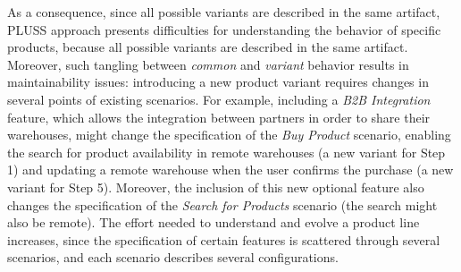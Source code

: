 As a consequence, since all possible variants are described in the same
artifact, PLUSS approach presents difficulties for understanding the behavior
of specific products, because all possible variants are described in the same artifact. 
Moreover, such tangling between \emph{common} and
\emph{variant} behavior results in maintainability issues: introducing a new product variant
requires changes in several points of existing scenarios. For example, including a
\emph{B2B Integration} feature, which allows the integration between partners in
order to share their warehouses, might change the specification of the \emph{Buy
Product} scenario, enabling the search for product availability in remote
warehouses (a new variant for Step 1) and updating a remote warehouse when the
user confirms the purchase (a new variant for Step 5). Moreover, the inclusion of
this new optional feature also changes the specification of the \emph{Search for
Products} scenario (the search might also be remote). The effort
needed to understand and evolve a product line increases, since the
specification of certain features is scattered through several scenarios,
and each scenario describes several configurations.



